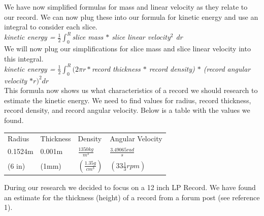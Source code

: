 \documentclass[a4paper, 11pt, oneside]{book} %
\begin{document}
We have now simplified formulas for mass and linear velocity as they relate to our record. We can now plug these into our formula for kinetic energy and use an integral to consider each slice. \\
\vspace{0.5\baselineskip} %
\vspace{0.5\baselineskip} %
\textit{kinetic energy = $\frac{1}{2} \int_{0}^{R}$slice mass $*$ slice linear velocity$^2$ dr}\\
\vspace{0.5\baselineskip} %
\vspace{0.5\baselineskip} %
We will now plug our simplifications for slice mass and slice linear velocity into this integral. \\
\vspace{0.5\baselineskip} %
\vspace{0.5\baselineskip} %
\textit{kinetic energy = $\frac{1}{2} \int_{0}^{R}(2\pi r * $record thickness $*$ record density) $*$ (record angular velocity $* r)^2 dr$}\\
\vspace{0.5\baselineskip} %
\vspace{0.5\baselineskip} %
This formula now shows us what characteristics of a record we should research to estimate the kinetic energy. We need to find values for radius, record thickness, record density, and record angular velocity. Below is a table with the values we found.\\
\begin{table}[!h]
\centering
\begin{tabular}{|l|l|l|l|}
\hline
Radius  & Thickness & Density                        & Angular Velocity \\
0.1524m & 0.001m    & $\frac{1350kg}{m^3}$    & $\frac{3.49065 rad}{s}$    \\
(6 in)  & (1mm)     & $(\frac{1.35 g}{cm^3})$ & $(33 \frac{1}{3} rpm)$\\
\end{tabular}
\end{table}
\vspace{0.5\baselineskip} %
\vspace{0.5\baselineskip} %
During our research we decided to focus on a 12 inch LP Record. We have found an estimate for the thickness (height) of a record from a forum post (see reference 1).\\
\end{document}
